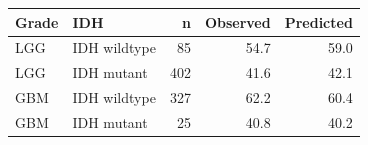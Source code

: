 \begin{tabular}{llrrr}
\toprule
\textbf{Grade} & \textbf{IDH} & \textbf{n} & \textbf{Observed} & \textbf{Predicted} \\
\midrule
LGG & IDH wildtype & 85 & 54.7 & 59.0 \\
LGG & IDH mutant & 402 & 41.6 & 42.1 \\
GBM & IDH wildtype & 327 & 62.2 & 60.4 \\
GBM & IDH mutant & 25 & 40.8 & 40.2 \\
\bottomrule
\end{tabular}
